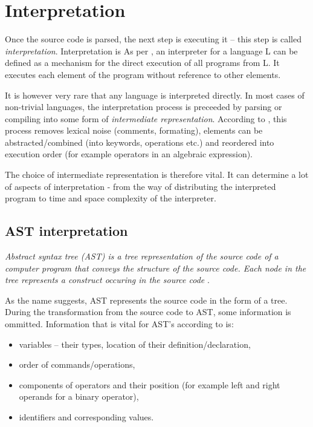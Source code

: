 \documentclass[thesis=M,english]{FITthesis}[2019/12/23]
\begin{document}
\section{Interpretation}
Once the source code is parsed, the next step is executing it -- this step is called \textit{interpretation}. Interpretation is
As per \cite{wolczko-02-ast-interpret}, an interpreter for a language L can be defined as a mechanism for the direct execution of all programs
from L. It executes each element of the program without reference to other elements.

It is however very rare that any language is interpreted directly. In most cases of non-trivial languages, the interpretation process
is preceeded by parsing or compiling into some form of \textit{intermediate representation}. According to \cite{wolczko-02-ast-interpret},
this process removes lexical noise (comments, formating), elements can be abstracted/combined (into keywords, operations etc.) and reordered
into execution order (for example operators in an algebraic expression).

The choice of intermediate representation is therefore vital. It can determine a lot of aspects of interpretation - from the way of distributing
the interpreted program to time and space complexity of the interpreter.

\subsection{AST interpretation}
\textit{Abstract syntax tree (AST) is a tree representation of the source code of a computer program that conveys the structure of the source code.
Each node in the tree represents a construct occuring in the source code }\cite{deepsource-ast}.

As the name suggests, AST represents the source code in the form of a tree. During the transformation from the source code to AST, some information
is ommitted. Information that is vital for AST's according to \cite{deepsource-ast} is:
\begin{itemize}
	\item variables -- their types, location of their definition/declaration,
	\item order of commands/operations,
	\item components of operators and their position (for example left and right operands for a binary operator),
	\item identifiers and corresponding values.
\end{itemize}
\end{document}
